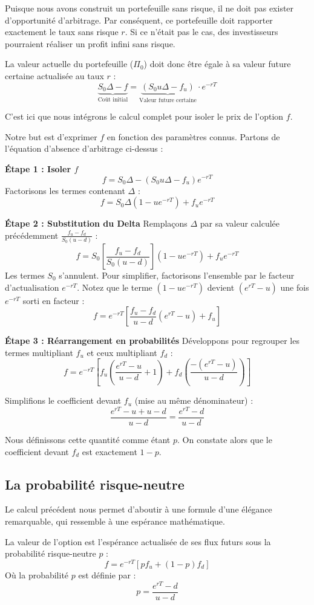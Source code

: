 Puisque nous avons construit un portefeuille sans risque, il ne doit pas exister d'opportunité d'arbitrage. Par conséquent, ce portefeuille doit rapporter exactement le taux sans risque $r$. Si ce n'était pas le cas, des investisseurs pourraient réaliser un profit infini sans risque.

La valeur actuelle du portefeuille ($\Pi_0$) doit donc être égale à sa valeur future certaine actualisée au taux $r$ :
$$ \underbrace{S_0 \Delta - f}_{\text{Coût initial}} = \underbrace{(S_0 u \Delta - f_u)}_{\text{Valeur future certaine}} \cdot e^{-rT} $$

C'est ici que nous intégrons le calcul complet pour isoler le prix de l'option $f$.

\begin{proofbox}
Notre but est d'exprimer $f$ en fonction des paramètres connus. Partons de l'équation d'absence d'arbitrage ci-dessus :

\textbf{Étape 1 : Isoler $f$}
$$ f = S_0 \Delta - (S_0 u \Delta - f_u) e^{-rT} $$
Factorisons les termes contenant $\Delta$ :
$$ f = S_0 \Delta (1 - u e^{-rT}) + f_u e^{-rT} $$

\textbf{Étape 2 : Substitution du Delta}
Remplaçons $\Delta$ par sa valeur calculée précédemment $\frac{f_u - f_d}{S_0(u - d)}$ :
$$ f = S_0 \left[ \frac{f_u - f_d}{S_0(u - d)} \right] (1 - u e^{-rT}) + f_u e^{-rT} $$
Les termes $S_0$ s'annulent. Pour simplifier, factorisons l'ensemble par le facteur d'actualisation $e^{-rT}$. Notez que le terme $(1 - u e^{-rT})$ devient $(e^{rT} - u)$ une fois $e^{-rT}$ sorti en facteur :
$$ f = e^{-rT} \left[ \frac{f_u - f_d}{u - d} (e^{rT} - u) + f_u \right] $$

\textbf{Étape 3 : Réarrangement en probabilités}
Développons pour regrouper les termes multipliant $f_u$ et ceux multipliant $f_d$ :
$$ f = e^{-rT} \left[ f_u \left( \frac{e^{rT} - u}{u - d} + 1 \right) + f_d \left( \frac{-(e^{rT} - u)}{u - d} \right) \right] $$

Simplifions le coefficient devant $f_u$ (mise au même dénominateur) :
$$ \frac{e^{rT} - u + u - d}{u - d} = \frac{e^{rT} - d}{u - d} $$

Nous définissons cette quantité comme étant $p$. On constate alors que le coefficient devant $f_d$ est exactement $1-p$.
\end{proofbox}

\subsection{La probabilité risque-neutre}

Le calcul précédent nous permet d'aboutir à une formule d'une élégance remarquable, qui ressemble à une espérance mathématique.

\begin{theorembox}
La valeur de l'option est l'espérance actualisée de ses flux futurs sous la probabilité risque-neutre $p$ :
$$ f = e^{-rT} [p f_u + (1 - p) f_d] $$
Où la probabilité $p$ est définie par :
$$ p = \frac{e^{rT} - d}{u - d} $$
\end{theorembox}